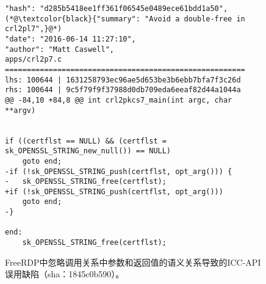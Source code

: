 \begin{figure}[t]
	\centering
\begin{lstlisting}
"hash": "d285b5418ee1ff361f06545e0489ece61bdd1a50",
(*@\textcolor{black}{"summary": "Avoid a double-free in crl2pl7",}@*)
"date": "2016-06-14 11:27:10",
"author": "Matt Caswell",
apps/crl2p7.c
=======================================================
lhs: 100644 | 1631258793ec96ae5d653be3b6ebb7bfa7f3c26d
rhs: 100644 | 9c5f79f9f37988d0db709eda6eeaf82d44a1044a
@@ -84,10 +84,8 @@ int crl2pkcs7_main(int argc, char **argv)


if ((certflst == NULL) && (certflst = sk_OPENSSL_STRING_new_null()) == NULL)
	goto end;
-if (!sk_OPENSSL_STRING_push(certflst, opt_arg())) {
-	sk_OPENSSL_STRING_free(certflst);
+if (!sk_OPENSSL_STRING_push(certflst, opt_arg()))
	goto end;
-}

end:
	sk_OPENSSL_STRING_free(certflst);
\end{lstlisting}
	\caption{
	FreeRDP中忽略调用关系中参数和返回值的语义关系导致的ICC-API误用缺陷（sha：1845c0b590）。
	}
	\label{fig:2-3-icc-3}
\end{figure}